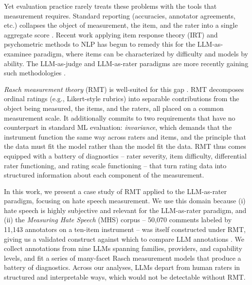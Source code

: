 \documentclass[11pt]{article}
\begin{document}
Yet evaluation practice rarely treats these problems with the tools that measurement requires. Standard reporting (accuracies, annotator agreements, etc.) collapses the object of measurement, the item, and the rater into a single aggregate score \cite{Salaudeen2025MeasurementToMeaning}. Recent work applying item response theory (IRT) and psychometric methods to NLP \cite{lalor2016building, vania2021comparing, Federiakin2025Leaderboards, Chen2025CompactIRT, Yao2025JEIRT, Ye2025LLMPsychometrics} has begun to remedy this for the LLM-as-examinee paradigm, where items can be characterized by difficulty and models by ability. The LLM-as-judge and LLM-as-rater paradigms are more recently gaining such methodologies \cite{giorgi2025human, Choi2026JudgeIRT, Feng2026NoisyJudges, Chen2026NoisyJudgeInference, Jiao2026RaterEffects}.

\textit{Rasch measurement theory} (RMT) is well-suited for this gap \cite{rasch1993probabilistic, andrich1988rasch, linacre1989manyfacet}. RMT decomposes ordinal ratings (e.g., Likert-style rubrics) into separable contributions from the object being measured, the items, and the raters, all placed on a common measurement scale. It additionally commits to two requirements that have no counterpart in standard ML evaluation: \textit{invariance}, which demands that the instrument function the same way across raters and items, and the principle that the data must fit the model rather than the model fit the data. RMT thus comes equipped with a battery of diagnostics -- rater severity, item difficulty, differential rater functioning, and rating scale functioning -- that turn rating data into structured information about each component of the measurement.

In this work, we present a case study of RMT applied to the LLM-as-rater paradigm, focusing on hate speech measurement. We use this domain because (i) hate speech is highly subjective and relevant for the LLM-as-rater paradigm, and (ii) the \textit{Measuring Hate Speech} (MHS) corpus -- 50{,}070 comments labeled by 11{,}143 annotators on a ten-item instrument -- was itself constructed under RMT, giving us a validated construct against which to compare LLM annotations \cite{DBLP:journals/corr/abs-2009-10277, sachdeva-etal-2022-measuring}. We collect annotations from nine LLMs spanning families, providers, and capability levels, and fit a series of many-facet Rasch measurement models that produce a battery of diagnostics. Across our analyses, LLMs depart from human raters in structured and interpretable ways, which would not be detectable without RMT.
\end{document}
